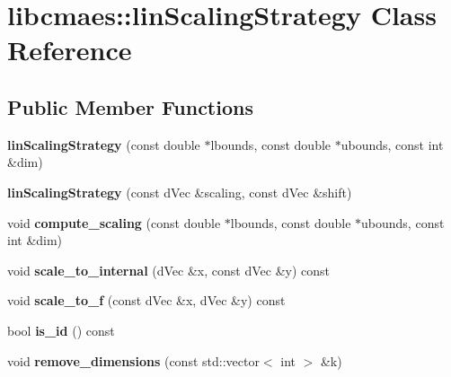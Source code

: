 \hypertarget{classlibcmaes_1_1linScalingStrategy}{\section{libcmaes\+:\+:lin\+Scaling\+Strategy Class Reference}
\label{classlibcmaes_1_1linScalingStrategy}
}
\subsection*{Public Member Functions}
\begin{DoxyCompactItemize}
\item 
\hypertarget{classlibcmaes_1_1linScalingStrategy_a02a64849f458cf8a440501d9e041b3e9}{{\bfseries lin\+Scaling\+Strategy} (const double $\ast$lbounds, const double $\ast$ubounds, const int \&dim)}\label{classlibcmaes_1_1linScalingStrategy_a02a64849f458cf8a440501d9e041b3e9}

\item 
\hypertarget{classlibcmaes_1_1linScalingStrategy_af798cb677f9f0ede111252c1ee05ab08}{{\bfseries lin\+Scaling\+Strategy} (const d\+Vec \&scaling, const d\+Vec \&shift)}\label{classlibcmaes_1_1linScalingStrategy_af798cb677f9f0ede111252c1ee05ab08}

\item 
\hypertarget{classlibcmaes_1_1linScalingStrategy_a043e908a7f3a7864c6a21ff5f041c48d}{void {\bfseries compute\+\_\+scaling} (const double $\ast$lbounds, const double $\ast$ubounds, const int \&dim)}\label{classlibcmaes_1_1linScalingStrategy_a043e908a7f3a7864c6a21ff5f041c48d}

\item 
\hypertarget{classlibcmaes_1_1linScalingStrategy_a6b111ef2e0f78c0f6a2cde92df7aa90e}{void {\bfseries scale\+\_\+to\+\_\+internal} (d\+Vec \&x, const d\+Vec \&y) const }\label{classlibcmaes_1_1linScalingStrategy_a6b111ef2e0f78c0f6a2cde92df7aa90e}

\item 
\hypertarget{classlibcmaes_1_1linScalingStrategy_a9ea06cf4d10c3015a154c763f88b862b}{void {\bfseries scale\+\_\+to\+\_\+f} (const d\+Vec \&x, d\+Vec \&y) const }\label{classlibcmaes_1_1linScalingStrategy_a9ea06cf4d10c3015a154c763f88b862b}

\item 
\hypertarget{classlibcmaes_1_1linScalingStrategy_a6a806b86273ed2ef3c4412ffc5d53662}{bool {\bfseries is\+\_\+id} () const }\label{classlibcmaes_1_1linScalingStrategy_a6a806b86273ed2ef3c4412ffc5d53662}

\item 
\hypertarget{classlibcmaes_1_1linScalingStrategy_a70d984a0858fe3247236f13117870765}{void {\bfseries remove\+\_\+dimensions} (const std\+::vector$<$ int $>$ \&k)}\label{classlibcmaes_1_1linScalingStrategy_a70d984a0858fe3247236f13117870765}

\end{DoxyCompactItemize}
